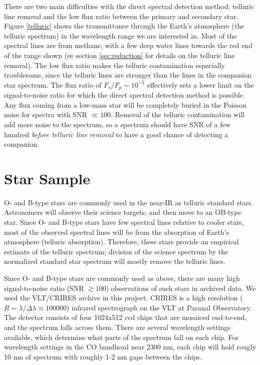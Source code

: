 \documentclass[11pt]{report}     %
\begin{document}
There are two main difficulties with the direct spectral detection method: 
telluric line removal and the low flux ratio between the primary and secondary
star. Figure \ref{telluric} shows the transmittance through the
Earth's atmosphere (the telluric spectrum) in the wavelength range we
are interested in. Most of the spectral lines are from methane, with a
few deep water lines towards the red end
of the range shown (ee section \ref{sec:reduction} for details on the
telluric line removal). The low flux ratio makes the telluric
contamination especially troublesome, since the telluric lines are
stronger than the lines in the companion star spectrum. The flux ratio of $F_s/F_p
\sim10^{-2}$ effectively sets a lower limit on the signal-to-noise
ratio for which the direct spectral detection method is possible. 
Any flux coming from a low-mass star will be completely buried
in the Poisson noise for spectra with SNR $\ll100$. Removal of the 
telluric contamination will add more noise to the spectrum, so a spectrum
should have SNR of a few hundred \emph{before telluric line removal}
to have a good chance of detecting a companion.



\section{Star Sample}
\label{sec:sample}
O- and B-type stars are commonly used in the near-IR as telluric
standard stars. Astronomers will observe their science targets, and
then move to an OB-type star. Since O- and B-type stars have few
spectral lines relative to cooler stars, most of the observed
spectral lines will be from the absorption of Earth's atmosphere
(telluric absorption). Therefore, these stars provide an empirical
estimate of the telluric spectrum; division of the science spectrum by
the normalized standard star spectrum will mostly remove the telluric
lines. 

Since O- and B-type stars are commonly used as above, there are
many high signal-to-noise ratio (SNR $\gtrsim 100$)
observations of such stars in archived data. We used the VLT/CRIRES
archive in this project. CRIRES is a high
resolution ($R = \lambda / \Delta \lambda \approx 100000$) infrared
spectrograph on the VLT at Paranal Observatory. The detector consists of four
1024x512 ccd chips that are mosaiced end-to-end, and
the spectrum falls across them. There are several wavelength settings
available, which determine what parts of the spectrum fall on each 
chip. For wavelength settings in the CO
bandhead near 2300 nm, each chip will hold rougly 10 nm of spectrum
with roughly 1-2 nm gaps between the chips.
\end{document}
